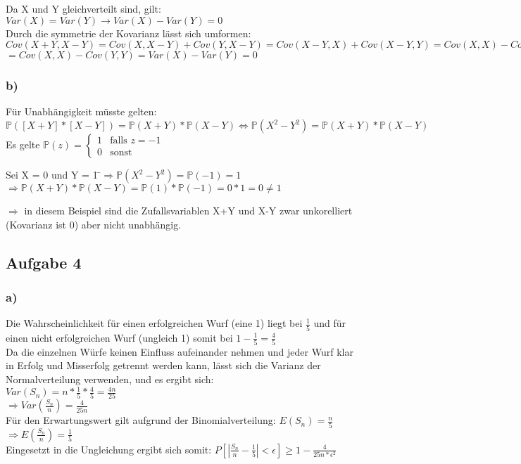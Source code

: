 \documentclass[11pt]{amsart}
\begin{document}
Da X und Y gleichverteilt sind, gilt: $Var(X) = Var(Y) \rightarrow Var(X) - Var(Y) = 0$\\
Durch die symmetrie der Kovarianz lässt sich umformen:\\
$Cov(X+Y, X-Y) = Cov(X,X-Y) + Cov(Y,X-Y) = Cov(X-Y,X) + Cov(X-Y, Y) = Cov(X,X) - Cov(Y,X) + Cov(X,Y) - Cov(Y,Y)$\\
$ = Cov(X,X) - Cov(Y,Y) = Var(X) - Var(Y) = 0$

\subsubsection*{b)}

Für Unabhängigkeit müsste gelten: $\mathbb{P}([X+Y]*[X-Y]) = \mathbb{P}(X+Y)*\mathbb{P}(X-Y) \Leftrightarrow \mathbb{P}(X^2 - Y^2) = \mathbb{P}(X+Y)*\mathbb{P}(X-Y)$ \\
Es gelte $\mathbb{P}(z) = \begin{cases} 1 &\mbox{falls } z=-1 \\ 0 &\mbox{sonst} \end{cases}$
\begin{tabbing}
Sei X = 0 und Y = 1 \=$\Rightarrow \mathbb{P}(X^2-Y^2) = \mathbb{P}(-1) = 1$ \\
\> $\Rightarrow \mathbb{P}(X+Y)*\mathbb{P}(X-Y) = \mathbb{P}(1)*\mathbb{P}(-1) = 0*1 = 0 \not = 1$

\end{tabbing}
$\Rightarrow$ in diesem Beispiel sind die Zufallsvariablen X+Y und X-Y zwar unkorelliert (Kovarianz ist 0) aber nicht unabhängig.

\subsection*{Aufgabe 4}

\subsubsection*{a)}

Die Wahrscheinlichkeit für einen erfolgreichen Wurf (eine 1) liegt bei $\frac{1}{5}$ und für einen 
nicht erfolgreichen Wurf (ungleich 1) somit bei $1 - \frac{1}{5} = \frac{4}{5}$ \\
Da die einzelnen Würfe keinen Einfluss aufeinander nehmen und jeder Wurf klar in Erfolg und Misserfolg 
getrennt werden kann, lässt sich die Varianz der Normalverteilung verwenden, und es ergibt sich: \\
$Var(S_n) = n * \frac{1}{5} * \frac{4}{5} =  \frac{4n}{25}$ \\
$\Rightarrow Var(\frac{S_n}{n}) = \frac{4}{25n}$ \\
Für den Erwartungswert gilt aufgrund der Binomialverteilung: $E(S_n) = \frac{n}{5}$ \\
$\Rightarrow E(\frac{S_n}{n}) = \frac{1}{5}$ \\
Eingesetzt in die Ungleichung ergibt sich somit: $P[|\frac{S_n}{n} - \frac{1}{5}| < \epsilon] \geq 1 - \frac{4}{25n * \epsilon^2}$
\end{document}
